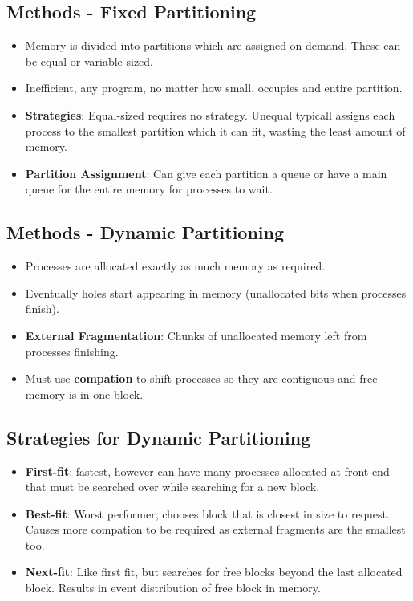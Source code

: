 \documentclass[fontsize=5pt]{scrartcl}
\begin{document}
\begin{multicols}{3}
\begin{itemize}
        \subsection{Methods - Fixed Partitioning}
        \begin{itemize}
          \item Memory is divided into partitions which are assigned on demand. These can be equal or variable-sized.
          \item Inefficient, any program, no matter how small, occupies and entire partition.  
          \item \textbf{Strategies}: Equal-sized requires no strategy. Unequal typicall assigns each process to the smallest partition which it can fit,
                wasting the least amount of memory.
          \item \textbf{Partition Assignment}: Can give each partition a queue or have a main queue for the entire memory for processes to wait.
        \end{itemize}
        \subsection{Methods - Dynamic Partitioning}
        \begin{itemize}
          \item Processes are allocated exactly as much memory as required.
          \item Eventually holes start appearing in memory (unallocated bits when processes finish).
          \item \textbf{External Fragmentation}: Chunks of unallocated memory left from processes finishing.
          \item Must use \textbf{compation} to shift processes so they are contiguous and free memory is in one block.
        \end{itemize}
        \subsection{Strategies for Dynamic Partitioning}
        \begin{itemize}
          \item \textbf{First-fit}: fastest, however can have many processes allocated at front end that must be searched over
                while searching for a new block.
          \item \textbf{Best-fit}: Worst performer, chooses block that is closest in size to request. Causes more compation to be
                required as external fragments are the smallest too.
          \item \textbf{Next-fit}: Like first fit, but searches for free blocks beyond the last allocated block. Results in event distribution of free block
                in memory.
        \end{itemize}

\end{itemize}
\end{multicols}
\end{document}
